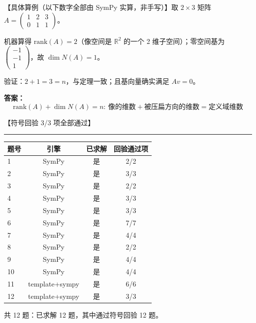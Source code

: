 \documentclass[12pt, a4paper]{article}
\begin{document}
【具体算例（以下数字全部由 SymPy 实算，非手写）】取 $2 \times 3$ 矩阵 $A = \begin{pmatrix} 1 & 2 & 3 \\ 0 & 1 & 1 \end{pmatrix}$。

机器算得 $\mathrm{rank}(A) = 2$（像空间是 $\mathbb{R}^2$ 的一个 2 维子空间）；零空间基为 $\begin{pmatrix} -1 \\ -1 \\ 1 \end{pmatrix}$，故 $\dim N(A) = 1$。

验证：$2 + 1 = 3 = n$，与定理一致；且基向量确实满足 $Av = 0$。

\textbf{答案：}
\[\boxed{\mathrm{rank}(A) + \dim N(A) = n:\ \text{像的维数} + \text{被压扁方向的维数} = \text{定义域维数}}\]

\textcolor{okgreen}{【符号回验 3/3 项全部通过】}

\vspace{0.8em}
\hrule
\vspace{0.8em}

\begin{center}
\begin{tabular}{@{}lccc@{}}
\toprule
题号 & 引擎 & 已求解 & 回验通过项 \\
\midrule
    1 & SymPy & 是 & 2/2 \\
    2 & SymPy & 是 & 3/3 \\
    3 & SymPy & 是 & 2/2 \\
    4 & SymPy & 是 & 3/3 \\
    5 & SymPy & 是 & 3/3 \\
    6 & SymPy & 是 & 7/7 \\
    7 & SymPy & 是 & 4/4 \\
    8 & SymPy & 是 & 2/2 \\
    9 & SymPy & 是 & 4/4 \\
    10 & SymPy & 是 & 4/4 \\
    11 & template+sympy & 是 & 6/6 \\
    12 & template+sympy & 是 & 3/3 \\
\bottomrule
\end{tabular}
\end{center}

\noindent 共 12 题：已求解 12 题，其中通过符号回验 12 题。
\end{document}
